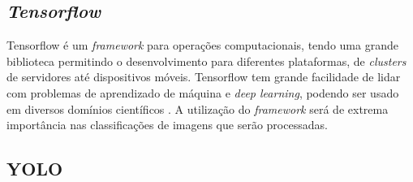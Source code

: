 
\subsection{\textit{Tensorflow}}
Tensorflow é um \textit{framework} para operações computacionais, tendo uma grande biblioteca permitindo o desenvolvimento para diferentes plataformas, de \textit{clusters} de servidores até dispositivos móveis. Tensorflow tem grande facilidade de lidar com problemas de aprendizado de máquina e \textit{deep learning}, podendo ser usado em diversos domínios científicos \cite{tensorflow2015}. A utilização do \textit{framework} será de extrema importância nas classificações de imagens que serão processadas.



\subsection{YOLO}






